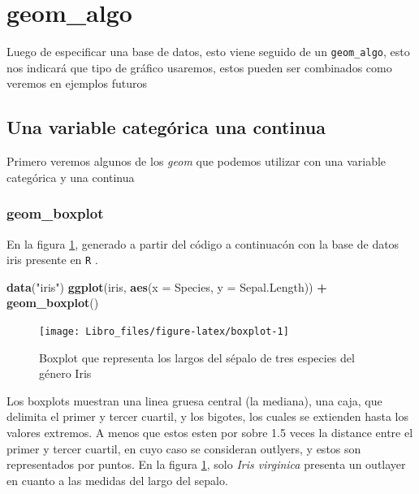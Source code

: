 \documentclass[]{book}
\newenvironment{Shaded}{\begin{snugshade}}{\end{snugshade}}
\newcommand{\DataTypeTok}[1]{\textcolor[rgb]{0.13,0.29,0.53}{#1}}
\newcommand{\KeywordTok}[1]{\textcolor[rgb]{0.13,0.29,0.53}{\textbf{#1}}}
\newcommand{\NormalTok}[1]{#1}
\newcommand{\OperatorTok}[1]{\textcolor[rgb]{0.81,0.36,0.00}{\textbf{#1}}}
\newcommand{\StringTok}[1]{\textcolor[rgb]{0.31,0.60,0.02}{#1}}
\begin{document}
\hypertarget{geom_algo}{%
\section{geom\_algo}\label{geom_algo}}

Luego de especificar una base de datos, esto viene seguido de un
\texttt{geom\_algo}, esto nos indicará que tipo de gráfico usaremos,
estos pueden ser combinados como veremos en ejemplos futuros

\hypertarget{una-variable-categorica-una-continua}{%
\subsection{Una variable categórica una
continua}\label{una-variable-categorica-una-continua}}

Primero veremos algunos de los \emph{geom} que podemos utilizar con una
variable categórica y una continua

\hypertarget{geom_boxplot}{%
\subsubsection{geom\_boxplot}\label{geom_boxplot}}

En la figura \ref{fig:boxplot}, generado a partir del código a
continuacón con la base de datos iris presente en \texttt{R}
\citep{anderson1935irises}.

\begin{Shaded}
\begin{Highlighting}[]
\KeywordTok{data}\NormalTok{(}\StringTok{"iris"}\NormalTok{)}
\KeywordTok{ggplot}\NormalTok{(iris, }\KeywordTok{aes}\NormalTok{(}\DataTypeTok{x =}\NormalTok{ Species, }\DataTypeTok{y =}\NormalTok{ Sepal.Length)) }\OperatorTok{+}\StringTok{ }\KeywordTok{geom_boxplot}\NormalTok{()}
\end{Highlighting}
\end{Shaded}

\begin{figure}

{\centering \texttt{[image: Libro\_files/figure-latex/boxplot-1]} 

}

\caption{Boxplot que representa los largos del sépalo de tres especies del género Iris}\label{fig:boxplot}
\end{figure}

Los boxplots muestran una linea gruesa central (la mediana), una caja,
que delimita el primer y tercer cuartil, y los bigotes, los cuales se
extienden hasta los valores extremos. A menos que estos esten por sobre
1.5 veces la distance entre el primer y tercer cuartil, en cuyo caso se
consideran outlyers, y estos son representados por puntos. En la figura
\ref{fig:boxplot}, solo \emph{Iris virginica} presenta un outlayer en
cuanto a las medidas del largo del sepalo.
\end{document}
